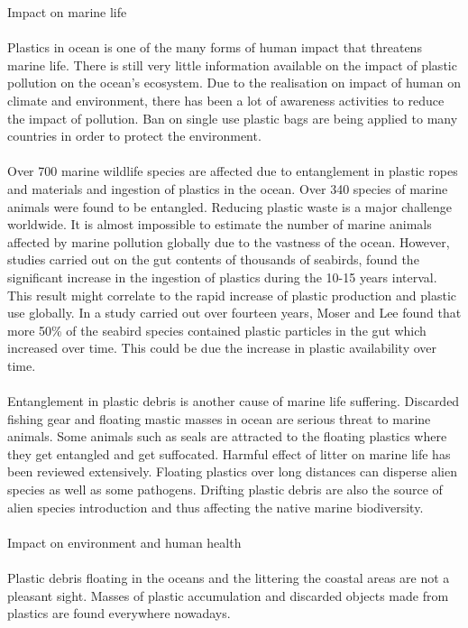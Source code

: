 \documentclass[10pt]{article}\usepackage[]{graphicx}\usepackage[]{color}
\begin{document}
Impact on marine life
\\
\\
Plastics in ocean is one of the many forms of human impact that threatens marine life. There is still very little information available on the impact of plastic pollution on the ocean's ecosystem. Due to the realisation on impact of human on climate and environment, there has been a lot of awareness activities to reduce the impact of pollution. Ban on single use plastic bags are being applied to many countries in order to protect the environment. 
\\
\\
Over 700 marine wildlife species are affected due to entanglement in plastic ropes and materials and ingestion of plastics in the ocean.\cite{GALL2015} Over 340 species of marine animals were found to be entangled.\cite{KUHN2015} Reducing plastic waste is a major challenge worldwide. It is almost impossible to estimate the number of marine animals affected by marine pollution globally due to the vastness of the ocean. However, studies carried out on the gut contents of thousands of seabirds, found the significant increase in the ingestion of plastics during the 10-15 years interval.\cite{ROBARDS1995} This result might correlate to the rapid increase of plastic production and plastic use globally.  In a study carried out over fourteen years, Moser and Lee \cite{MOSER1992} found that more 50\% of the seabird species contained plastic particles in the gut which increased over time. This could be due the increase in plastic availability over time. 
\\
\\
Entanglement in plastic debris is another cause of marine life suffering. Discarded fishing gear and floating mastic masses in ocean are serious threat to marine animals. Some animals such as seals are attracted to the floating plastics where they get entangled and get suffocated. Harmful effect of litter on marine life has been reviewed extensively.\cite{GALL2015} \cite{KUHN2015} \cite{RYAN2015} \cite{WILLIAMS2019} Floating plastics over long distances can disperse alien species as well as some pathogens. Drifting plastic debris are also the source of alien species introduction and thus affecting the native marine biodiversity.\cite{GREGORY2009} \cite{KIESSLING2015} 
\\
\\
Impact on environment and human health
\\
\\
Plastic debris floating in the oceans and the littering the coastal areas are not a pleasant sight. Masses of plastic accumulation and discarded objects made from plastics are found everywhere nowadays. 
\end{document}
